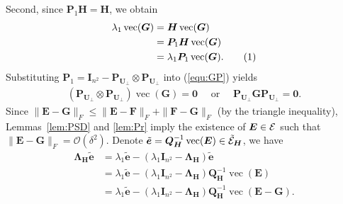 \documentclass{article}
\def\E{{\cal E}}
\newcommand{\norm}[1]{\|#1\|} %
\newcommand\numberthis{\addtocounter{equation}{1}\tag{\theequation}}
\DeclareMathOperator*{\vect}{vec}
\newcommand{\topnew}{\top \hspace{-0.05cm}}
\begin{document}
Second, since $\bm P_1 \bm H = \bm H$, we obtain
\begin{align*}
    \lambda_1 \vect(\bm G) &= \bm H \vect(\bm G) \\
    &= \bm P_1 \bm H \vect(\bm G) \\
    &= \lambda_1 \bm P_1 \vect(\bm G) . \numberthis \label{equ:GP}
\end{align*}
Substituting $\bm P_1 = \bm I_{n^2} - \bm P_{\bm U_\perp} \otimes \bm P_{\bm U_\perp}$ into (\ref{equ:GP}) yields
\begin{align*}
    (\bm P_{\bm U_\perp} \otimes \bm P_{\bm U_\perp}) \vect(\bm G) = \bm 0 \quad \text{ or } \quad \bm P_{\bm U_\perp} \bm G \bm P_{\bm U_\perp} = \bm 0 .
\end{align*}
Since $\norm{\bm E - \bm G}_F \leq \norm{\bm E - \bm F}_F + \norm{\bm F - \bm G}_F$ (by the triangle inequality), Lemmas~\ref{lem:PSD} and \ref{lem:Pr} imply the existence of $\bm E \in \E$ such that $\norm{\bm E - \bm G}_F = \mathcal{O}(\delta^2)$. 
Denote $\tilde{\bm e} = \bm Q^{-1}_{\bm H} \vect(\bm E) \in \tilde{\E}_{\bm H}$, we have
\begin{align*}
    \bm \Lambda_{\bm H} \tilde{\bm e} &= \lambda_1 \tilde{\bm e} - (\lambda_1 \bm I_{n^2} - \bm \Lambda_{\bm H}) \tilde{\bm e} \\
    &= \lambda_1 \tilde{\bm e} - (\lambda_1 \bm I_{n^2} - \bm \Lambda_{\bm H}) \bm Q^{-1}_{\bm H} \vect(\bm E) \\
    &= \lambda_1 \tilde{\bm e} - (\lambda_1 \bm I_{n^2} - \bm \Lambda_{\bm H}) \bm Q^{-1}_{\bm H} \vect(\bm E - \bm G) .
\end{align*}
\end{document}
